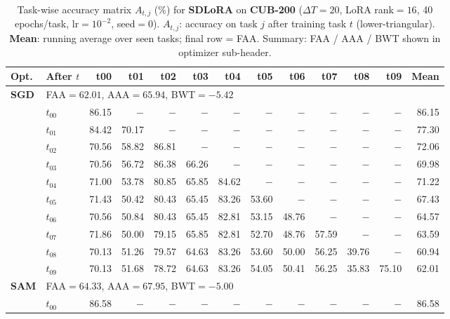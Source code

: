 \begin{table}[ht]
\centering
\caption{%
  Task-wise accuracy matrix $A_{t,j}$ (\%) for \textbf{SDLoRA} on \textbf{CUB-200}
  ($\Delta T=20$, LoRA rank$=16$, 40 epochs/task, lr$=10^{-2}$, seed$=0$).
  $A_{t,j}$: accuracy on task $j$ after training task $t$ (lower-triangular).
  \textbf{Mean}: running average over seen tasks; final row = FAA.
  Summary: FAA / AAA / BWT shown in optimizer sub-header.
}
\label{tab:raw_sdlora_cub200}
\setlength{\tabcolsep}{2.8pt}
\renewcommand{\arraystretch}{0.88}
\scriptsize
\begin{tabular}{@{}l l r r r r r r r r r r r@{}}
\toprule
\textbf{Opt.} & \textbf{After $t$} & \textbf{t00} & \textbf{t01} & \textbf{t02} & \textbf{t03} & \textbf{t04} & \textbf{t05} & \textbf{t06} & \textbf{t07} & \textbf{t08} & \textbf{t09} & \textbf{Mean} \\
\midrule
\multirow{11}{*}{\textbf{SGD}} & \multicolumn{12}{l}{\quad\small FAA$=62.01$,\; AAA$=65.94$,\; BWT$=-5.42$} \\
 & $t_{00}$ & 86.15 & $-$ & $-$ & $-$ & $-$ & $-$ & $-$ & $-$ & $-$ & $-$ & 86.15 \\
 & $t_{01}$ & 84.42 & 70.17 & $-$ & $-$ & $-$ & $-$ & $-$ & $-$ & $-$ & $-$ & 77.30 \\
 & $t_{02}$ & 70.56 & 58.82 & 86.81 & $-$ & $-$ & $-$ & $-$ & $-$ & $-$ & $-$ & 72.06 \\
 & $t_{03}$ & 70.56 & 56.72 & 86.38 & 66.26 & $-$ & $-$ & $-$ & $-$ & $-$ & $-$ & 69.98 \\
 & $t_{04}$ & 71.00 & 53.78 & 80.85 & 65.85 & 84.62 & $-$ & $-$ & $-$ & $-$ & $-$ & 71.22 \\
 & $t_{05}$ & 71.43 & 50.42 & 80.43 & 65.45 & 83.26 & 53.60 & $-$ & $-$ & $-$ & $-$ & 67.43 \\
 & $t_{06}$ & 70.56 & 50.84 & 80.43 & 65.45 & 82.81 & 53.15 & 48.76 & $-$ & $-$ & $-$ & 64.57 \\
 & $t_{07}$ & 71.86 & 50.00 & 79.15 & 65.85 & 82.81 & 52.70 & 48.76 & 57.59 & $-$ & $-$ & 63.59 \\
 & $t_{08}$ & 70.13 & 51.26 & 79.57 & 64.63 & 83.26 & 53.60 & 50.00 & 56.25 & 39.76 & $-$ & 60.94 \\
 & $t_{09}$ & 70.13 & 51.68 & 78.72 & 64.63 & 83.26 & 54.05 & 50.41 & 56.25 & 35.83 & 75.10 & 62.01 \\
\midrule
\multirow{11}{*}{\textbf{SAM}} & \multicolumn{12}{l}{\quad\small FAA$=64.33$,\; AAA$=67.95$,\; BWT$=-5.00$} \\
 & $t_{00}$ & 86.58 & $-$ & $-$ & $-$ & $-$ & $-$ & $-$ & $-$ & $-$ & $-$ & 86.58 \\

\end{tabular}
\end{table}
